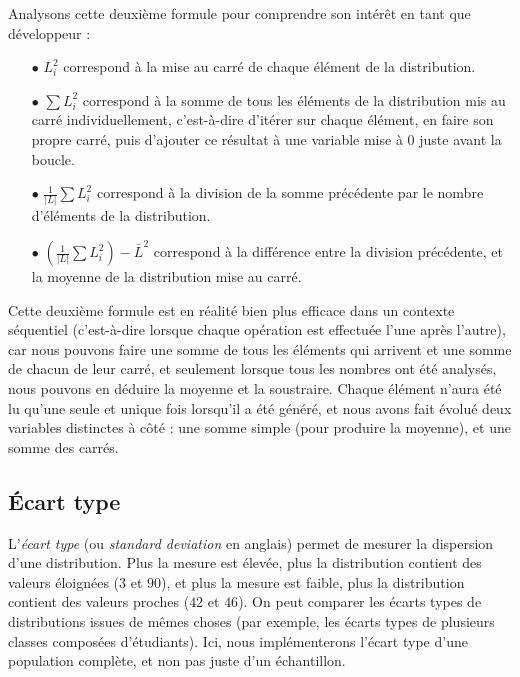 \noindent Analysons cette deuxième formule pour comprendre son intérêt en tant que développeur :

\medskip

\begin{itemize}
\item[$\bullet$] $ L_{i}^{2} $ correspond à la mise au carré de chaque élément de la distribution.

\item[$\bullet$] $ \sum L_{i}^{2} $ correspond à la somme de tous les éléments de la distribution mis au carré individuellement, c'est-à-dire d'itérer sur chaque élément, en faire son propre carré, puis d'ajouter ce résultat à une variable mise à $ 0 $ juste avant la boucle.

\item[$\bullet$] $ \frac{1}{|L|} \sum L_{i}^{2} $ correspond à la division de la somme précédente par le nombre d'éléments de la distribution.

\item[$\bullet$] $ ( \frac{1}{|L|} \sum L_{i}^{2} ) - \bar{L}^{2} $ correspond à la différence entre la division précédente, et la moyenne de la distribution mise au carré.
\end{itemize}

\noindent Cette deuxième formule est en réalité bien plus efficace dans un contexte séquentiel (c'est-à-dire lorsque chaque opération est effectuée l'une après l'autre), car nous pouvons faire une somme de tous les éléments qui arrivent et une somme de chacun de leur carré, et seulement lorsque tous les nombres ont été analysés, nous pouvons en déduire la moyenne et la soustraire.
Chaque élément n'aura été lu qu'une seule et unique fois lorsqu'il a été généré, et nous avons fait évolué deux variables distinctes à côté : une somme simple (pour produire la moyenne), et une somme des carrés.

%
%


\bigskip


\subsection{\'Ecart type}

\noindent L'\textit{écart type} (ou \textit{standard deviation} en anglais) permet de mesurer la dispersion d'une distribution.
Plus la mesure est élevée, plus la distribution contient des valeurs éloignées ($ 3 $ et $ 90 $), et plus la mesure est faible, plus la distribution contient des valeurs proches ($ 42 $ et $ 46 $).
On peut comparer les écarts types de distributions issues de mêmes choses (par exemple, les écarts types de plusieurs classes composées d'étudiants).
Ici, nous implémenterons l'écart type d'une population complète, et non pas juste d'un échantillon.

